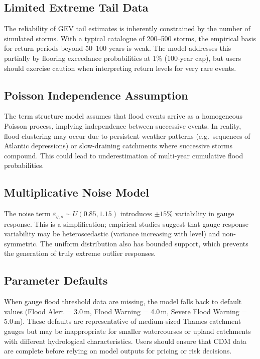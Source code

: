 \documentclass[11pt,a4paper]{article}
\begin{document}
\subsection{Limited Extreme Tail Data}

The reliability of GEV tail estimates is inherently constrained by the number of simulated storms. With a typical catalogue of 200--500 storms, the empirical basis for return periods beyond 50--100 years is weak. The model addresses this partially by flooring exceedance probabilities at 1\% (100-year cap), but users should exercise caution when interpreting return levels for very rare events.

\subsection{Poisson Independence Assumption}

The term structure model assumes that flood events arrive as a homogeneous Poisson process, implying independence between successive events. In reality, flood clustering may occur due to persistent weather patterns (e.g.\ sequences of Atlantic depressions) or slow-draining catchments where successive storms compound. This could lead to underestimation of multi-year cumulative flood probabilities.

\subsection{Multiplicative Noise Model}

The noise term $\varepsilon_{g,s} \sim U(0.85, 1.15)$ introduces $\pm 15\%$ variability in gauge response. This is a simplification; empirical studies suggest that gauge response variability may be heteroscedastic (variance increasing with level) and non-symmetric. The uniform distribution also has bounded support, which prevents the generation of truly extreme outlier responses.

\subsection{Parameter Defaults}

When gauge flood threshold data are missing, the model falls back to default values (Flood Alert = 3.0\,m, Flood Warning = 4.0\,m, Severe Flood Warning = 5.0\,m). These defaults are representative of medium-sized Thames catchment gauges but may be inappropriate for smaller watercourses or upland catchments with different hydrological characteristics. Users should ensure that CDM data are complete before relying on model outputs for pricing or risk decisions.
\end{document}
